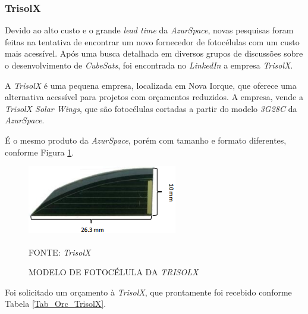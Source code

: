 \documentclass[
	12pt,				%
	openright,			%
	oneside,			%
	a4paper,			%
	english,			%
	french,				%
	spanish,			%
	brazil,				%
	oldfontcommands
	]{abntex2}
\begin{document}
\subsubsection[TrisolX]{TrisolX}	
	
	Devido ao alto custo e o grande \textit{lead time} da \textit{AzurSpace}, novas pesquisas foram feitas na tentativa de encontrar um novo fornecedor de fotocélulas com um custo mais acessível. Após uma busca detalhada em diversos grupos de discussões sobre o desenvolvimento de \textit{CubeSats}, foi encontrada no \textit{LinkedIn} a empresa \textit{TrisolX}.
	
	A \textit{TrisolX} é uma pequena empresa, localizada em Nova Iorque, que oferece uma alternativa acessível para projetos com orçamentos reduzidos. A empresa, vende a \textit{TrisolX Solar Wings}, que são fotocélulas cortadas a partir do modelo \textit{3G28C} da \textit{AzurSpace}.
	
	É o mesmo produto da \textit{AzurSpace}, porém com tamanho e formato diferentes, conforme Figura \ref{Fig_Cell_TrisolX}.
	
	\begin{figure}[th]
		\caption{MODELO DE FOTOCÉLULA DA \textit{TRISOLX}}
		\label{Fig_Cell_TrisolX}
		\centering
		\includegraphics[width=0.5\linewidth]{./figs/TrisolX}
			
		\begin{small}
			FONTE: \textit{TrisolX}\textsuperscript{\cite{TrisolX}}
		\end{small}		
	\end{figure}	

	Foi solicitado um orçamento à \textit{TrisolX}, que prontamente foi recebido conforme Tabela \ref{Tab_Orc_TrisolX}.
	
\end{document}
